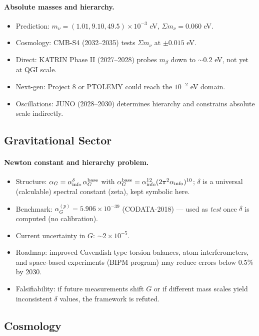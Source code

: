 \documentclass{article}
\numberwithin{equation}{section}
\theoremstyle{plain}
\theoremstyle{definition}
\theoremstyle{remark}
\newcommand{\Ngravbase}{\alpha_{\rm info}^{12}(2\pi^2\alpha_{\rm info})^{10}}
\begin{document}
\paragraph{Absolute masses and hierarchy.}
\begin{itemize}
    \item Prediction: $m_\nu = (1.01, 9.10, 49.5)\times 10^{-3}$ eV, $\Sigma m_\nu = 0.060$ eV.
    \item Cosmology: CMB-S4 (2032--2035) tests $\Sigma m_\nu$ at $\pm 0.015$ eV.
    \item Direct: KATRIN Phase II (2027--2028) probes $m_{\beta}$ down to $\sim 0.2$ eV, not yet at QGI scale.
    \item Next-gen: Project 8 or PTOLEMY could reach the $10^{-2}$ eV domain.
    \item Oscillations: JUNO (2028--2030) determines hierarchy and constrains absolute scale indirectly.
\end{itemize}

\subsection{Gravitational Sector}
\paragraph{Newton constant and hierarchy problem.}
\begin{itemize}
    \item Structure: $\alpha_G = \alpha_{\rm info}^{\delta}\,\alpha_G^{\rm base}$ with $\alpha_G^{\rm base}=\Ngravbase$; $\delta$ is a universal (calculable) spectral constant (zeta), kept symbolic here.
    \item Benchmark: $\alpha_G^{(p)}=5.906\times 10^{-39}$ (CODATA-2018) — used as \emph{test} once $\delta$ is computed (no calibration).
    \item Current uncertainty in $G$: $\sim 2\times 10^{-5}$.
    \item Roadmap: improved Cavendish-type torsion balances, atom interferometers, and space-based experiments (BIPM program) may reduce errors below 0.5\% by 2030.
    \item Falsifiability: if future measurements shift $G$ or if different mass scales yield inconsistent $\delta$ values, the framework is refuted.
\end{itemize}

\subsection{Cosmology}
\end{document}
